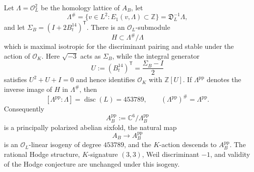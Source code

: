\begin{proposition}\label{prop:ppisogenous}
Let $\Lambda=\mathcal O_L^2$ be the homology lattice of $A_B$, let
\[
 \Lambda^\#=\{v\in L^2:E_1(v,\Lambda)\subset\mathbb Z\}
              =\mathfrak D_L^{-1}\Lambda,
\]
and let $\Sigma_B=(I+2B_t^{14})^{\mathsf T}$.  There is an $\mathcal O_L$-submodule
\[
 H\subset \Lambda^\#/\Lambda
\]
which is maximal isotropic for the discriminant pairing and stable under the action of $\mathcal O_K$.  Here $\sqrt{-3}$ acts as $\Sigma_B$, while the integral generator
\[
 U:=(B_t^{14})^{\mathsf T}=\frac{\Sigma_B-I}{2}
\]
satisfies $U^2+U+I=0$ and hence identifies $\mathcal O_K$ with $\mathbb Z[U]$.  If $\Lambda^{\mathrm{pp}}$ denotes the inverse image of $H$ in $\Lambda^\#$, then
\[
 [\Lambda^{\mathrm{pp}}:\Lambda]=\operatorname{disc}(L)=453789,
 \qquad (\Lambda^{\mathrm{pp}})^\#=\Lambda^{\mathrm{pp}}.
\]
Consequently
\[
 A_B^{\mathrm{pp}}:=\mathbb C^6/\Lambda_B^{\mathrm{pp}}
\]
is a principally polarized abelian sixfold, the natural map
\[
 A_B\longrightarrow A_B^{\mathrm{pp}}
\]
is an $\mathcal O_L$-linear isogeny of degree $453789$, and the $K$-action descends to $A_B^{\mathrm{pp}}$.  The rational Hodge structure, $K$-signature $(3,3)$, Weil discriminant $-1$, and validity of the Hodge conjecture are unchanged under this isogeny.
\end{proposition}

